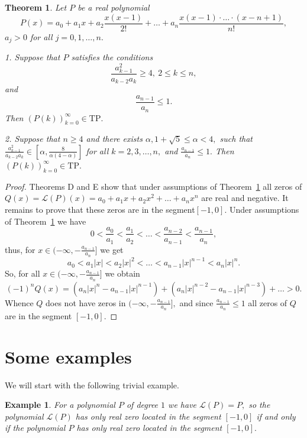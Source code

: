\documentclass[12pt]{amsart}
\newcounter{count}
\numberwithin{count}{section}
\newtheorem{Example}[count]{Example}
\newtheorem{theorem}[count]{Theorem}
\begin{document}
\begin{theorem}
\label{th2}
Let $P$ be a real polynomial 
$$P(x)= a_0 + a_1 x +a_2 \frac{x(x-1)}{2!} 
+  \ldots +a_n \frac{x(x-1)\cdot \ldots \cdot (x-n+1)}{n!},$$
$a_j>0 $ for all $j=0, 1, \ldots, n.$

1. Suppose that $P$ satisfies the conditions
$$ \frac {a_{k-1}^2}{a_{k-2}a_k} \geq 4, \    2 \leq k \leq n, $$
and
$$ \frac{a_{n-1}}{a_n} \leq 1. $$
Then $(P(k))_{k=0}^\infty \in \mathrm{TP}.$ 


2. Suppose that $n \geq 4$ and there exists $\alpha,  1 + \sqrt{5} \leq \alpha < 4,$ such that
 $\frac {a_{k-1}^2}{a_{k-2}a_k} \in \left[\alpha, \frac{8}{\alpha(4 - \alpha)} \right]$ for all 
 $k =2, 3, \ldots, n,$  and $ \frac{a_{n-1}}{a_n} \leq 1. $  Then $(P(k))_{k=0}^\infty \in \mathrm{TP}.$ 


\end{theorem}


\begin{proof}
Theorems D and E show that under assumptions of Theorem~\ref{th2} 
all zeros of  $Q(x) = \mathcal{L}(P) (x) = a_0 +a_1x +a_2 x^2 + \ldots + 
a_n x^n$ are real and negative. It remains to prove that these zeros 
are in the segment$[-1, 0].$ Under assumptions of Theorem~\ref{th2} 
we have 
$$0 < \frac{a_0}{a_1} < \frac{a_1}{a_2} <  \ldots < \frac{a_{n-2}}{a_{n-1}} < \frac{a_{n-1}}{a_n},  $$
thus, for $x\in  (-\infty, - \frac{a_{n-1}}{a_n}]$ we get
$$ a_0 < a_1 |x| < a_2 |x|^2 < \ldots < a_{n-1}|x|^{n-1} < a_n |x|^n.  $$
So, for all $x\in  (-\infty, - \frac{a_{n-1}}{a_n}]$ we obtain
$$(-1)^n Q(x) = (a_n |x|^n - a_{n-1}|x|^{n-1}) + (a_n |x|^{n-2} - a_{n-1}|x|^{n-3}) +\ldots >0.  $$
Whence $Q$ does not have zeros in $ (-\infty, - \frac{a_{n-1}}{a_n}],$ and since $ \frac{a_{n-1}}{a_n} \leq 1$
all zeros of $Q$ are in the segment $[-1, 0].$ 
\end{proof}


\section{Some examples}

We will start with the following trivial example.

\begin{Example}
\label{ex1} For a polynomial $P$ of degree $1$ we have $\mathcal{L}(P) = P,$
so the polynomial $\mathcal{L}(P)$ has only real zero located in the segment $[-1, 0]$ if
and only if the polynomial $P$ has only real zero located in the segment $[-1, 0].$
\end{Example}
\end{document}
